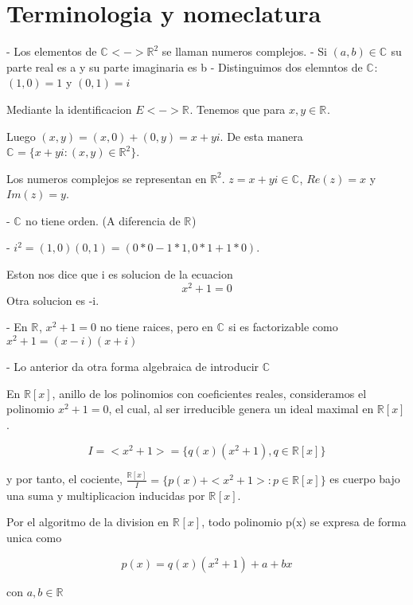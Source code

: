 \section{Terminologia y nomeclatura}

- Los elementos de \(\mathbb{C}^{} <-> \mathbb{R}^{2}\) se llaman numeros complejos.
- Si \((a,b) \in \mathbb{C}^{} \) su parte real es a y su parte imaginaria es b
- Distinguimos dos elemntos de \(\mathbb{C}^{}\): \((1,0) = 1\) y \((0,1) = i\)

Mediante la identificacion \( E <-> \mathbb{R}^{}\). Tenemos que para \(x,y \in \mathbb{R}^{}\).


Luego \((x,y) = (x,0)+(0,y) = x + yi\).
De esta manera \(\mathbb{C}^{} = \{x+yi : (x,y) \in \mathbb{R}^{2}\}\).

Los numeros complejos se representan en \(\mathbb{R}^{2}\).
\(z = x+yi \in \mathbb{C}^{}\), \(Re(z) = x\) y \(Im(z) = y\).


- \( \mathbb{C}^{}\) no tiene orden. (A diferencia de \(\mathbb{R}^{}\))

- \(i^2 = (1,0)(0,1) = (0*0-1*1, 0*1+1*0)\).

Eston nos dice que i es solucion de la ecuacion
\begin{equation*}
  x^2+1=0
\end{equation*}
Otra solucion es -i.

- En \(\mathbb{R}^{}\), \(x^2+1=0 \) no tiene raices, pero en \(\mathbb{C}^{}\) si es factorizable como \(x^2+1= (x-i)(x+i)\)

- Lo anterior da otra forma algebraica de introducir \(\mathbb{C}^{}\)

En \(\mathbb{R}[x]\), anillo de los polinomios con coeficientes reales, consideramos el polinomio \(x^2+1=0\), el cual, al ser irreducible genera un ideal maximal en  \(\mathbb{R}[x]\).

\[ I = <x^2+1> = \{q(x)(x^2+1), q \in \mathbb{R}[x]\}\]

y por tanto, el cociente, \(\frac{\mathbb{R}[x]}{I} = \{p(x)+<x^2+1> : p \in \mathbb{R}[x]\}\) es cuerpo bajo una suma y multiplicacion inducidas por \(\mathbb{R}^{}[x]\).

Por el algoritmo de la division en \(\mathbb{R}^{}[x]\), todo polinomio p(x) se expresa de forma unica como

\[p(x) = q(x)(x^2+1) + a +bx\]

con \(a,b \in \mathbb{R}^{}\)

